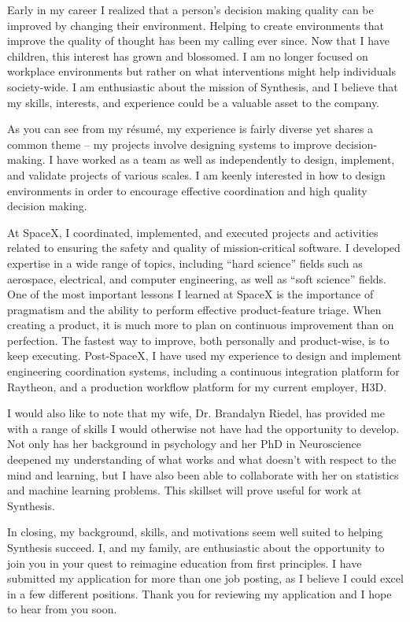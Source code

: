 \begin{cvletter}


Early in my career I realized that a person's decision making quality can be improved by changing
their environment. Helping to create environments that improve the quality of thought has been my
calling ever since. Now that I have children, this interest has grown and blossomed. I am no longer
focused on workplace environments but rather on what interventions might help individuals
society-wide. I am enthusiastic about the mission of Synthesis, and I believe that my skills,
interests, and experience could be a valuable asset to the company.

As you can see from my résumé, my experience is fairly diverse yet shares a common theme -- my
projects involve designing systems to improve decision-making. I have worked as a team as well as
independently to design, implement, and validate projects of various scales. I am keenly interested
in how to design environments in order to encourage effective coordination and high quality decision
making.

At SpaceX, I coordinated, implemented, and executed projects and activities related to ensuring the
safety and quality of mission-critical software. I developed expertise in a wide range of topics,
including ``hard science'' fields such as aerospace, electrical, and computer engineering, as well
as ``soft science'' fields. One of the most important lessons I learned at SpaceX is the importance
of pragmatism and the ability to perform effective product-feature triage. When creating a product,
it is much more to plan on continuous improvement than on perfection. The fastest way to improve,
both personally and product-wise, is to keep executing. Post-SpaceX, I have used my experience to
design and implement engineering coordination systems, including a continuous integration platform
for Raytheon, and a production workflow platform for my current employer, H3D.

I would also like to note that my wife, Dr. Brandalyn Riedel, has provided me with a range of skills
I would otherwise not have had the opportunity to develop. Not only has her background in psychology
and her PhD in Neuroscience deepened my understanding of what works and what doesn't with respect to
the mind and learning, but I have also been able to collaborate with her on statistics and machine
learning problems. This skillset will prove useful for work at Synthesis.

In closing, my background, skills, and motivations seem well suited to helping Synthesis succeed. I,
and my family, are enthusiastic about the opportunity to join you in your quest to reimagine
education from first principles. I have submitted my application for more than one job posting, as I
believe I could excel in a few different positions. Thank you for reviewing my application and I
hope to hear from you soon.


\end{cvletter}

